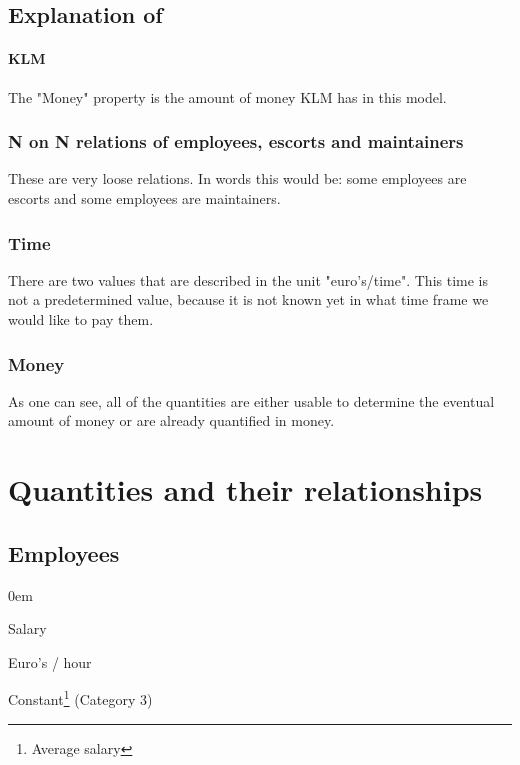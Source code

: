 \documentclass[a4paper, 11pt, notitlepage]{report}
\begin{document}
\section{Explanation of}
\subsubsection{KLM}
The "Money" property is the amount of money KLM has in this model.

\subsection{N on N relations of employees, escorts and maintainers}
These are very loose relations. In words this would be: some employees are escorts and some employees are maintainers.

\subsection{Time}
There are two values that are described in the unit "euro's/time". This time is not a predetermined value, because it is not known yet in what time frame we would like to pay them.

\subsection{Money}
As one can see, all of the quantities are either usable to determine the eventual amount of money or are already quantified in money.


\setcounter{chapter}{+9}
\chapter{Quantities and their relationships}
	\section{Employees}
	\begin{description}
	\itemsep0em
	\item[Property:] Salary
	\item[Unit:] Euro's / hour
	\item[Role:] Constant\footnote{Average salary}  (Category 3)
	\end{description}
\end{document}
